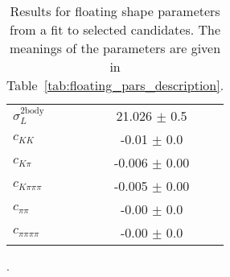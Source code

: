 \begin{table}[h]
\begin{tabular}{lc}
      $\sigma_L^\mathrm{2body}$ & 21.026 $\pm$ 0.5 \\
      $c_{KK}$ & -0.01 $\pm$ 0.0 \\
      $c_{K\pi}$ & -0.006 $\pm$ 0.00 \\
      $c_{K\pi\pi\pi}$ & -0.005 $\pm$ 0.00 \\
      $c_{\pi\pi}$ & -0.00 $\pm$ 0.0 \\
      $c_{\pi\pi\pi\pi}$ & -0.00 $\pm$ 0.0 \\
      \bottomrule
  \end{tabular}
  \caption{Results for floating shape parameters from a fit to selected candidates. The meanings of the parameters are given in Table~\ref{tab:floating_pars_description}.}.
\label{tab:floating_pars_shapes}
\end{table}
